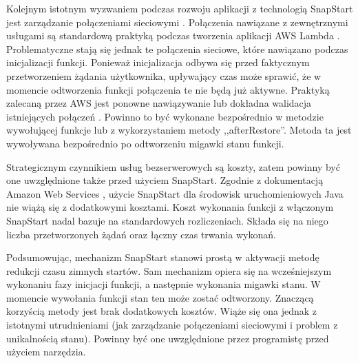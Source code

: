 Kolejnym istotnym wyzwaniem podczas rozwoju aplikacji z technologią SnapStart jest zarządzanie połączeniami sieciowymi \cite{amazonSnapstartDeveloperGUide}.
Połączenia nawiązane z zewnętrznymi usługami są standardową praktyką podczas tworzenia aplikacji AWS Lambda \cite{eismann2021reviewserverlessusecases}\cite{Ivanov_Petrova_2024}.
Problematyczne stają się jednak te połączenia sieciowe, które nawiązano podczas inicjalizacji funkcji. 
Ponieważ inicjalizacja odbywa się przed faktycznym przetworzeniem żądania użytkownika, upływający czas może sprawić, że w momencie odtworzenia funkcji połączenia te nie będą już aktywne.
Praktyką zalecaną przez AWS jest ponowne nawiązywanie lub dokładna walidacja istniejących połączeń \cite{amazonSnapstartDeveloperGUide}.
Powinno to być wykonane bezpośrednio w metodzie wywołującej funkcje lub z wykorzystaniem metody ,,afterRestore''.
Metoda ta jest wywoływana bezpośrednio po odtworzeniu migawki stanu funkcji.

Strategicznym czynnikiem usług bezserwerowych są koszty, zatem powinny być one uwzględnione także przed użyciem SnapStart.
Zgodnie z dokumentacją Amazon Web Services \cite{amazonSnapstartDeveloperGUide}, użycie SnapStart dla środowisk uruchomieniowych Java nie wiążą się z dodatkowymi kosztami.
Koszt wykonania funkcji z włączonym SnapStart nadal bazuje na standardowych rozliczeniach.
Składa się na niego liczba przetworzonych żądań oraz łączny czas trwania wykonań.

Podsumowując, mechanizm SnapStart stanowi prostą w aktywacji metodę redukcji czasu zimnych startów.
Sam mechanizm opiera się na wcześniejszym wykonaniu fazy inicjacji funkcji, a następnie wykonania migawki stanu.
W momencie wywołania funkcji stan ten może zostać odtworzony.
Znaczącą korzyścią metody jest brak dodatkowych kosztów.
Wiąże się ona jednak z istotnymi utrudnieniami (jak zarządzanie połączeniami sieciowymi i problem z unikalnością stanu).
Powinny być one uwzględnione przez programistę przed użyciem narzędzia.